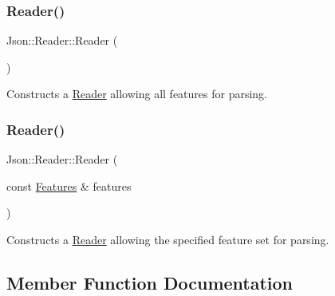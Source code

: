 \hypertarget{class_json_1_1_reader_a0b3c4e24c8393354bab57a6ba3ffc27f}{}\label{class_json_1_1_reader_a0b3c4e24c8393354bab57a6ba3ffc27f} 
\subsubsection{\texorpdfstring{Reader()}{Reader()}\hspace{0.1cm}{\footnotesize\ttfamily [3/4]}}
{\footnotesize\ttfamily Json\+::\+Reader\+::\+Reader (\begin{DoxyParamCaption}{ }\end{DoxyParamCaption})}



Constructs a \hyperlink{class_json_1_1_reader}{Reader} allowing all features for parsing. 

\hypertarget{class_json_1_1_reader_a45f17831118337309180313e93ac33f8}{}\label{class_json_1_1_reader_a45f17831118337309180313e93ac33f8} 
\subsubsection{\texorpdfstring{Reader()}{Reader()}\hspace{0.1cm}{\footnotesize\ttfamily [4/4]}}
{\footnotesize\ttfamily Json\+::\+Reader\+::\+Reader (\begin{DoxyParamCaption}\item[{const \hyperlink{class_json_1_1_features}{Features} \&}]{features }\end{DoxyParamCaption})}



Constructs a \hyperlink{class_json_1_1_reader}{Reader} allowing the specified feature set for parsing. 



\subsection{Member Function Documentation}
\hypertarget{class_json_1_1_reader_aaea3bd62d12ffb6117a61476c0685049}{}\label{class_json_1_1_reader_aaea3bd62d12ffb6117a61476c0685049} 
